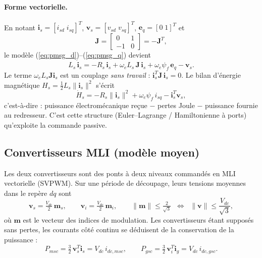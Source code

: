 \documentclass[11pt,a4paper]{article}
\theoremstyle{remark}
\newcommand{\Jm}{\mathbf{J}}            %
\newcommand{\vect}[1]{\bm{#1}}
\newcommand{\eq}{\vect{e}_q}
\begin{document}
\paragraph{Forme vectorielle.} En notant $\vect{i}_s=[i_{sd}\;i_{sq}]^T$,
$\vect{v}_s=[v_{sd}\;v_{sq}]^T$, $\eq=[0\;1]^T$ et
\begin{equation}
  \Jm = \begin{bmatrix} 0 & 1\\ -1 & 0\end{bmatrix} = -\Jm^T ,
\end{equation}
le modèle (\ref{eq:pmsg_d})--(\ref{eq:pmsg_q}) devient
\begin{equation}
  L_s\,\dot{\vect{i}}_s = -R_s\,\vect{i}_s + \omega_e L_s\,\Jm\,\vect{i}_s + \omega_e\psi_f\,\eq - \vect{v}_s .
  \label{eq:pmsg_vect}
\end{equation}
Le terme $\omega_e L_s\Jm\vect{i}_s$ est un couplage \emph{sans travail} :
$\vect{i}_s^T\Jm\,\vect{i}_s=0$. Le bilan d'énergie magnétique
$H_s=\tfrac12 L_s\|\vect{i}_s\|^2$ s'écrit
\begin{equation}
  \dot H_s = -R_s\|\vect{i}_s\|^2 + \omega_e\psi_f\, i_{sq} - \vect{i}_s^T\vect{v}_s ,
\end{equation}
c'est-à-dire : puissance électromécanique reçue $-$ pertes Joule $-$ puissance fournie au redresseur.
C'est cette structure (Euler--Lagrange / Hamiltonienne à ports) qu'exploite la commande passive.

\subsection{Convertisseurs MLI (modèle moyen)}
Les deux convertisseurs sont des ponts à deux niveaux commandés en MLI vectorielle (SVPWM).
Sur une période de découpage, leurs tensions moyennes dans le repère $dq$ sont
\begin{equation}
  \vect{v}_s = \tfrac{V_{dc}}{2}\,\vect{m}_s, \qquad
  \vect{v}_i = \tfrac{V_{dc}}{2}\,\vect{m}_i, \qquad
  \|\vect{m}\| \le \tfrac{2}{\sqrt3}
  \;\;\Longleftrightarrow\;\;
  \|\vect{v}\| \le \frac{V_{dc}}{\sqrt3},
  \label{eq:mli}
\end{equation}
où $\vect{m}$ est le vecteur des indices de modulation. Les convertisseurs étant supposés sans pertes,
les courants côté continu se déduisent de la conservation de la puissance :
\begin{equation}
  P_{msc} = \tfrac32\,\vect{v}_s^T\vect{i}_s = V_{dc}\, i_{dc,msc}, \qquad
  P_{gsc} = \tfrac32\,\vect{v}_i^T\vect{i}_g = V_{dc}\, i_{dc,gsc}.
\end{equation}
\end{document}
